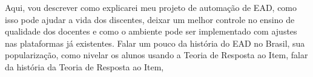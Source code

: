 Aqui, vou descrever como explicarei meu projeto de automação de EAD, como isso pode ajudar a vida dos discentes, deixar um melhor controle no ensino de qualidade dos docentes e como o ambiente pode ser implementado com ajustes nas plataformas já existentes. Falar um pouco da história do EAD no Brasil, sua popularização, como nivelar os alunos usando a Teoria de Resposta ao Item, falar da história da Teoria de Resposta ao Item, 